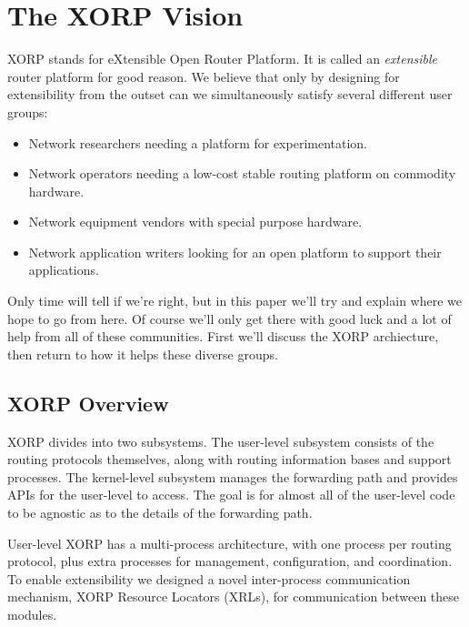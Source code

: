 \section{The XORP Vision}

XORP stands for eXtensible Open Router Platform.  It is called an {\it
extensible} router platform for good reason.  We believe that only by
designing for extensibility from the outset can we simultaneously
satisfy several different user groups:
\begin{itemize}
\vspace{-0.07in}
\item Network researchers needing a platform for experimentation.
\vspace{-0.07in}
\item Network operators needing a low-cost stable routing platform on
commodity hardware.
\vspace{-0.07in}
\item Network equipment vendors with special purpose hardware.
\vspace{-0.07in}
\item Network application writers looking for an open platform to
support their applications.
\end{itemize}
\vspace{-0.05in}
Only time will tell if we're right, but in this paper we'll try and
explain where we hope to go from here.  Of course we'll only get there
with good luck and a lot of help from all of these communities.  First
we'll discuss the XORP archiecture, then return to how it helps these
diverse groups.

\subsection{XORP Overview}

XORP divides into two subsystems. The user-level subsystem consists of the routing protocols themselves, along with routing
information bases and support processes. The kernel-level subsystem manages the forwarding path and provides APIs for the user-level to access. The goal is for almost all of the user-level code to be agnostic as to the details of the forwarding path.

User-level XORP has a multi-process architecture, with
one process per routing protocol, plus extra processes for management,
configuration, and coordination.  To enable extensibility we designed
a novel inter-process communication mechanism, XORP Resource
Locators (XRLs), for communication between these modules.  

